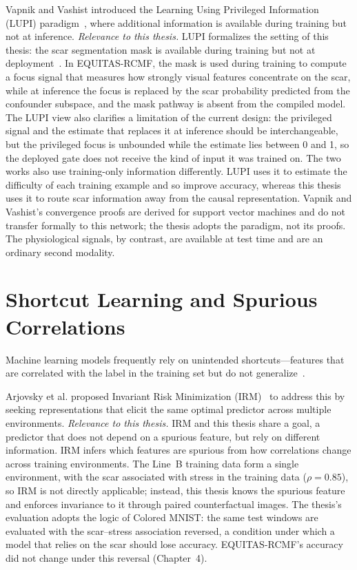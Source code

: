 Vapnik and Vashist introduced the Learning Using Privileged Information (LUPI) paradigm~\cite{vapnik2009}, where additional information is available during training but not at inference. 
\textit{Relevance to this thesis.} LUPI formalizes the setting of this thesis: the scar segmentation mask is available during training but not at deployment~\cite{vapnik2009, vapnik2015}. In EQUITAS-RCMF, the mask is used during training to compute a focus signal that measures how strongly visual features concentrate on the scar, while at inference the focus is replaced by the scar probability predicted from the confounder subspace, and the mask pathway is absent from the compiled model. The LUPI view also clarifies a limitation of the current design: the privileged signal and the estimate that replaces it at inference should be interchangeable, but the privileged focus is unbounded while the estimate lies between 0 and 1, so the deployed gate does not receive the kind of input it was trained on. The two works also use training-only information differently. LUPI uses it to estimate the difficulty of each training example and so improve accuracy, whereas this thesis uses it to route scar information away from the causal representation. Vapnik and Vashist's convergence proofs are derived for support vector machines and do not transfer formally to this network; the thesis adopts the paradigm, not its proofs. The physiological signals, by contrast, are available at test time and are an ordinary second modality.

\section{Shortcut Learning and Spurious Correlations}

Machine learning models frequently rely on unintended shortcuts---features that are correlated with the label in the training set but do not generalize~\cite{geirhos2020}. 

Arjovsky et al. proposed Invariant Risk Minimization (IRM)~\cite{arjovsky2019} to address this by seeking representations that elicit the same optimal predictor across multiple environments. 
\textit{Relevance to this thesis.} IRM and this thesis share a goal, a predictor that does not depend on a spurious feature, but rely on different information. IRM infers which features are spurious from how correlations change across training environments. The Line~B training data form a single environment, with the scar associated with stress in the training data ($\rho = 0.85$), so IRM is not directly applicable; instead, this thesis knows the spurious feature and enforces invariance to it through paired counterfactual images. The thesis's evaluation adopts the logic of Colored MNIST: the same test windows are evaluated with the scar--stress association reversed, a condition under which a model that relies on the scar should lose accuracy. EQUITAS-RCMF's accuracy did not change under this reversal (Chapter~4).

